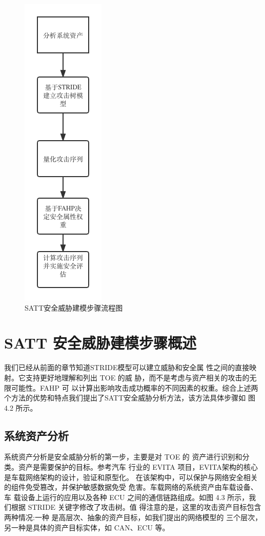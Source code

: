 \begin{figure}
  \centering
  \includegraphics[scale=0.5]{resources/img/a13.png}
  \caption{SATT安全威胁建模步骤流程图}
\end{figure}
\section{SATT 安全威胁建模步骤概述}
我们已经从前面的章节知道STRIDE模型可以建立威胁和安全属
性之间的直接映射。它支持更好地理解和列出 TOE 的威
胁，而不是考虑与资产相关的攻击的无限可能性。FAHP 可
以计算出影响攻击成功概率的不同因素的权重。综合上述两个方法的优势和特点我们提出了SATT安全威胁分析方法，该方法具体步骤如
图 4.2 所示。
\subsection{系统资产分析}
系统资产分析是安全威胁分析的第一步，主要是对 TOE 的
资产进行识别和分类。资产是需要保护的目标。参考汽车
行业的 EVITA\cite{jager2015evita} 项目，EVITA架构的核心是车载网络架构的设计，验证和原型化。
在该架构中，可以保护与网络安全相关的组件免受篡改，并保护敏感数据免受
危害。车载网络的系统资产由车载设备、车
载设备上运行的应用以及各种 ECU 之间的通信链路组成\cite{ruddle2009deliverable}。如图 4.3 所示，我们根据 STRIDE 关键字修改了攻击树。值
得注意的是，这里的攻击资产目标包含两种情况:一种
是高层次、抽象的资产目标，如我们提出的网络模型的
三个层次，另一种是具体的资产目标实体，如 CAN、ECU
等。
